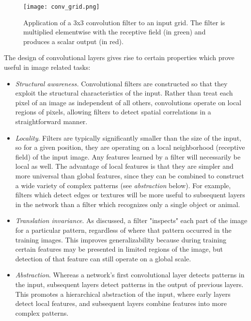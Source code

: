 \begin{figure}
	\centering
	\texttt{[image: conv\_grid.png]}
	\caption{Application of a 3x3 convolution filter to an input grid. The filter is multiplied elementwise with the receptive field (in green) and produces a scalar output (in red).}
	\label{fig:convolutionallayer}
\end{figure}

The design of convolutional layers gives rise to certain properties which prove useful in image related tasks:
 \begin{itemize}
 	\item \textit{Structural awareness.}
 	Convolutional filters are constructed so that they exploit the structural characteristics of the input.
 	Rather than treat each pixel of an image as independent of all others, convolutions operate on local regions of pixels, allowing filters to detect spatial correlations in a straightforward manner.
 	\item \textit{Locality}. 
 	Filters are typically significantly smaller than the size of the input, so for a given position, they are operating on a local neighborhood (receptive field) of the input image. 
 	Any features learned by a filter will necessarily be local as well. 
 	The advantage of local features is that they are simpler and more universal than global features, since they can be combined to construct a wide variety of complex patterns (see \textit{abstraction} below).
 	For example, filters which detect edges or textures will be more useful to subsequent layers in the network than a filter which recognizes only a single object or animal.
 	\item \textit{Translation invariance}. 
 	As discussed, a filter "inspects" each part of the image for a particular pattern, regardless of where that pattern occurred in the training images.
 	This improves generalizability because during training certain features may be presented in limited regions of the image, but detection of that feature can still operate on a global scale.
 	\item \textit{Abstraction}. Whereas a network's first convolutional layer detects patterns in the input, subsequent layers detect patterns in the output of previous layers. 
 	This promotes a hierarchical abstraction of the input, where early layers detect local features, and subsequent layers combine features into more complex patterns.

\end{itemize}
